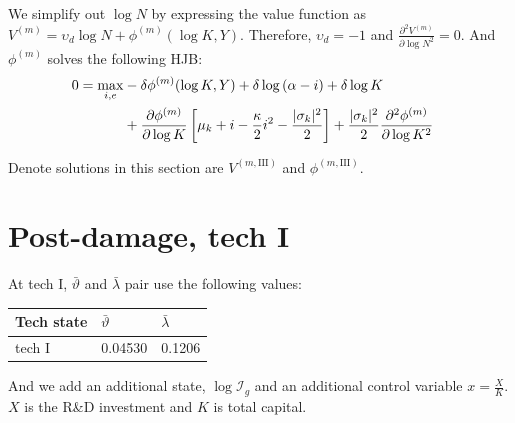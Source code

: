 \documentclass[11pt]{article}
\begin{document}
	We simplify out $\log N$ by expressing the value function as  $V^{(m)} = \upsilon_d \log N + \phi^{(m)}(\log K, Y)$. 
	Therefore, $\upsilon_d=-1$ and $\frac{\partial^2 V^{(m)}}{\partial \log N^2} = 0$. And $\phi^{(m)}$ solves the following HJB:
\begin{align*} 
	0 = \max_{i,e}  &   - \delta \phi^{(m)}(\log K,Y) +  \delta \log \left( \alpha - i \right) + \delta\log K \cr 
	& + \frac {\partial \phi^{(m)}}{\partial \log K} 
	\left[ \mu_k    + i   - {\frac { \kappa} 2} i^2  -  \frac  {|\sigma_k|^2}  2\right]  + \frac {|\sigma_k|^2} 2  \frac {\partial^2 \phi^{(m)}}{\partial \log K^2}
\end{align*} 

Denote solutions in this section are $V^{(m, \text{III})}$ and $\phi^{(m, \text{III})}$.

\section{Post-damage, tech I}

	At tech I, $\bar\vartheta$ and $\bar\lambda$ pair use the following values:
	\begin{table}[H]
		\centering
		\begin{tabular}{lll}
			\toprule
			Tech state & $\bar\vartheta$ & $\bar \lambda$\\
			\midrule
			tech I & 0.04530 & 0.1206\\
			\bottomrule
		\end{tabular}
	\end{table}
And we add an additional state, $\log \mathcal{I}_g$ and an additional control variable $x = \frac{X}{K}$.
$X$ is the R\&D investment and $K$ is total capital.
	 
\end{document}
